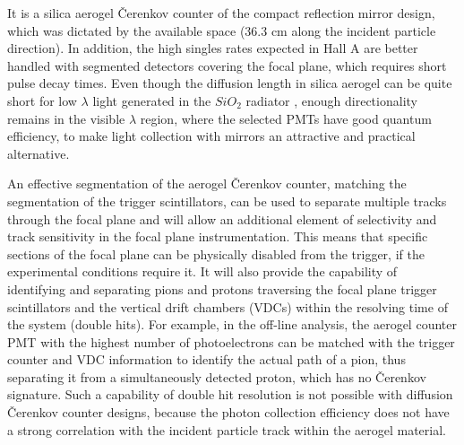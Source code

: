 It is a silica aerogel \v{C}erenkov counter of the compact reflection mirror design, 
which was dictated by the available space (36.3 cm along the incident particle direction). 
In addition, the high singles rates expected in Hall A are better handled 
with segmented detectors covering the focal plane, 
which requires short pulse decay times.
  Even though the diffusion length in silica aerogel can be quite short for 
low $\lambda$ light generated in the $SiO_2$ radiator \cite{Lippert:1993kt}, 
enough directionality remains in the visible $\lambda$ region, 
where the selected PMTs have good quantum efficiency, to make
light collection with mirrors an attractive and practical alternative. 

An effective segmentation of the aerogel \v{C}erenkov counter, matching the 
segmentation of the trigger scintillators, can be used to separate multiple
tracks through the focal plane and will allow an additional element of
selectivity and track sensitivity in the focal plane instrumentation.  This
means that specific sections of the focal plane can be physically disabled from
the trigger, if the experimental conditions require it.  It will also provide
the capability of identifying and separating pions and protons traversing the
focal plane trigger scintillators and the vertical drift chambers (VDCs) within
the resolving time of the system (double hits).  
For example, in the off-line analysis, the aerogel counter PMT with the highest 
number of photoelectrons can be matched with the trigger counter and 
VDC information to identify the actual path of a pion, 
thus separating it from a simultaneously detected proton, which
has no \v{C}erenkov signature.  
Such a capability of double hit resolution is not possible with diffusion 
\v{C}erenkov counter designs, because the photon collection efficiency does not 
have a strong correlation with the incident particle track within the aerogel material. 
 
